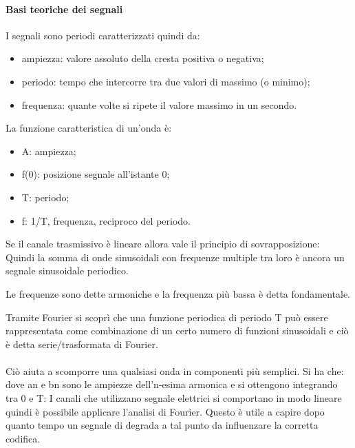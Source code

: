 \documentclass{subfiles}
\begin{document}
    \paragraph*{Basi teoriche dei segnali}
    I segnali sono periodi caratterizzati quindi da:\begin{itemize}
        \item ampiezza: valore assoluto della cresta positiva o negativa;
        \item periodo: tempo che intercorre tra due valori di massimo (o minimo);
        \item frequenza: quante volte si ripete il valore massimo in un secondo.
    \end{itemize}
    La funzione caratteristica di un'onda è: %
    \begin{itemize}
        \item A: ampiezza;
        \item f(0): posizione segnale all'istante 0;
        \item T: periodo;
        \item f: 1/T, frequenza, reciproco del periodo.
    \end{itemize}
    Se il canale trasmissivo è lineare allora vale il principio di sovrapposizione:\\
    Quindi la somma di onde sinusoidali con frequenze multiple tra loro è ancora un segnale sinusoidale periodico.
    \begin{Note*}
        Le frequenze sono dette armoniche e la frequenza più bassa è detta fondamentale.
    \end{Note*}
    Tramite Fourier si scoprì che una funzione periodica di periodo T può essere rappresentata come combinazione di un certo numero 
    di funzioni sinusoidali e ciò è detta serie/trasformata di Fourier.\\ \\
    Ciò aiuta a scomporre una qualsiasi onda in componenti più semplici. Si ha che: 
    dove an e bn sono le ampiezze dell'n-esima armonica e si ottengono integrando tra 0 e T:
    I canali che utilizzano segnale elettrici si comportano in modo lineare quindi è possibile applicare l'analisi di Fourier. Questo è 
    utile a capire dopo quanto tempo un segnale di degrada a tal punto da influenzare la corretta codifica.
\end{document}
